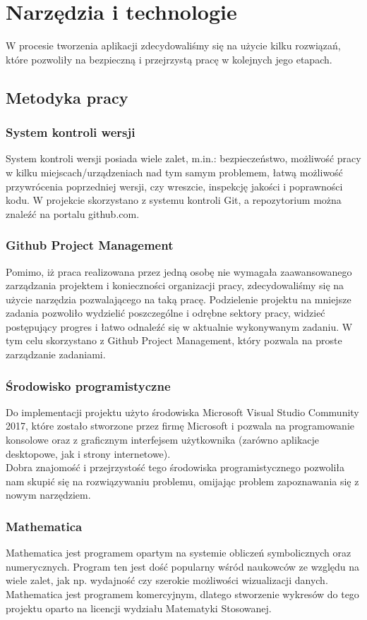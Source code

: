 \documentclass[twoside]{projektInzynierskiMS1}
\newcommand{\si}{ś}
\begin{document}
\section{Narzędzia i technologie}
W procesie tworzenia aplikacji zdecydowali\si my się na użycie kilku rozwiązań, które pozwoliły na bezpieczną i przejrzystą pracę w kolejnych jego etapach. \\
	\subsection{Metodyka pracy}
	\subsubsection{System kontroli wersji}
	System kontroli wersji posiada wiele zalet, m.in.: bezpieczeństwo, możliwo\si ć pracy w kilku miejscach/urządzeniach nad tym samym problemem, łatwą możliwo\si ć przywrócenia poprzedniej wersji, czy wreszcie, inspekcję jako\si ci i poprawno\si ci kodu. W projekcie skorzystano z systemu kontroli Git, a repozytorium można znaleźć na portalu github.com. 
	\subsubsection{Github Project Management}
Pomimo, iż praca realizowana przez jedną osobę nie wymagała zaawansowanego zarządzania projektem i konieczno\si ci organizacji pracy, zdecydowali\si my się na użycie narzędzia pozwalającego na taką pracę. Podzielenie projektu na mniejsze zadania pozwoliło wydzielić poszczególne i odrębne sektory pracy, widzieć postępujący progres i łatwo odnaleźć się w aktualnie wykonywanym zadaniu. W tym celu skorzystano z Github Project Management, który pozwala na proste zarządzanie zadaniami.
	\subsubsection{Środowisko programistyczne}
Do implementacji projektu użyto \si rodowiska Microsoft Visual Studio Community 2017, które zostało stworzone przez firmę Microsoft i pozwala na programowanie konsolowe oraz z graficznym interfejsem użytkownika (zarówno aplikacje desktopowe, jak i strony internetowe).  \\
Dobra znajomo\si ć i przejrzysto\si ć tego \si rodowiska programistycznego pozwoliła nam skupić się na rozwiązywaniu problemu, omijając problem zapoznawania się z nowym narzędziem.
	\subsubsection{Mathematica}
	Mathematica jest programem opartym na systemie obliczeń symbolicznych oraz numerycznych. Program ten jest do\si ć popularny w\si ród naukowców ze względu na wiele zalet, jak np. wydajno\si ć czy szerokie możliwo\si ci wizualizacji danych. Mathematica jest programem komercyjnym, dlatego stworzenie wykresów do tego projektu oparto na licencji wydziału Matematyki Stosowanej.
\end{document}
